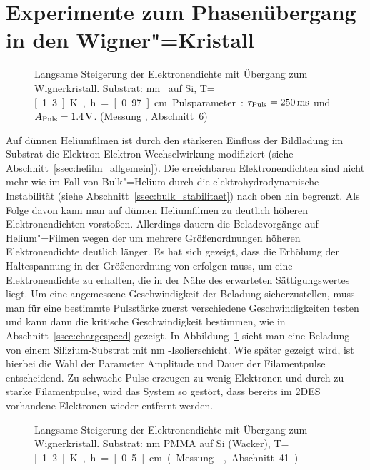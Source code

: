 \section{Experimente zum Phasenübergang in den Wigner"=Kristall} 
\begin{figure}[h!tbp]
    \centerline{%
        }
    \caption[Wigner-Übergang auf \SiO]{Langsame Steigerung der Elektronendichte mit Übergang zum Wignerkristall. Substrat: \unit[200]{nm} \SiO\ auf Si, T=\unit[1.3]{K}, h=\unit[0.97]{cm}. Pulsparameter: $\tau_\text{Puls}=\unit[250]{ms}$ und $A_\text{Puls}=\unit[1.4]{V}$. (Messung , Abschnitt~6)}
        \label{fig:wc_film1}
\end{figure}
Auf dünnen Heliumfilmen ist durch den stärkeren Einfluss der Bildladung im Substrat die Elektron-Elektron-Wechselwirkung modifiziert (siehe Abschnitt~\ref{ssec:hefilm_allgemein}). Die erreichbaren Elektronendichten sind nicht mehr wie im Fall von Bulk"=Helium durch die elektrohydrodynamische Instabilität (siehe Abschnitt~\ref{ssec:bulk_stabilitaet}) nach oben hin begrenzt. Als Folge davon kann man auf dünnen Heliumfilmen zu deutlich höheren Elektronendichten vorstoßen.  Allerdings dauern die Beladevorgänge auf Helium"=Filmen wegen der um mehrere Größenordnungen höheren Elektronendichte deutlich länger. Es hat sich gezeigt, dass die Erhöhung der Haltespannung in der Größenordnung von  erfolgen muss, um eine Elektronendichte zu erhalten, die in der Nähe des erwarteten Sättigungswertes liegt.
Um eine angemessene Geschwindigkeit der Beladung sicherzustellen, muss man für eine bestimmte Pulsstärke zuerst verschiedene Geschwindigkeiten testen und kann dann die kritische Geschwindigkeit bestimmen, wie in Abschnitt~\ref{ssec:chargespeed} gezeigt. In Abbildung~\ref{fig:wc_film1} sieht man eine Beladung von einem Silizium-Substrat mit \unit[200]{nm} \SiO-Isolierschicht. Wie später gezeigt wird, ist hierbei die Wahl der Parameter Amplitude und Dauer der Filamentpulse entscheidend. Zu schwache Pulse erzeugen zu wenig Elektronen und durch zu starke Filamentpulse, wird das System so gestört, dass bereits im 2DES vorhandene Elektronen wieder entfernt werden.
\begin{figure}[h!tbp]
    \centerline{%
        }
    \caption[Wigner-Übergang auf PMMA]{Langsame Steigerung der Elektronendichte mit Übergang zum Wignerkristall. Substrat: \unit[200]{nm} PMMA auf Si (Wacker), T=\unit[1.2]{K}, h=\unit[0.5]{cm}. (Messung , Abschnitt 41)}
    \label{fig:wc_film2}
\end{figure}

